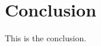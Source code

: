 \documentclass[../main.tex]{subfiles}
\begin{document}
\section{Conclusion}

This is the conclusion.
\end{document}
